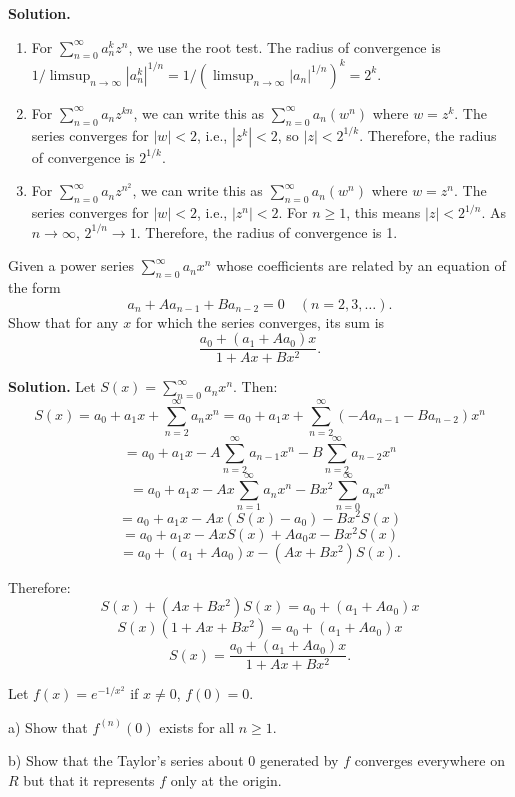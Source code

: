 \noindent\textbf{Solution.}
\begin{enumerate}[label=(\alph*)]
\item For \( \sum_{n=0}^{\infty} a_n^k z^n \), we use the root test. The radius of convergence is \( 1/\limsup_{n\to\infty} |a_n^k|^{1/n} = 1/(\limsup_{n\to\infty} |a_n|^{1/n})^k = 2^k \).

\item For \( \sum_{n=0}^{\infty} a_nz^{kn} \), we can write this as \( \sum_{n=0}^{\infty} a_n(w^n) \) where \( w = z^k \). The series converges for \( |w| < 2 \), i.e., \( |z^k| < 2 \), so \( |z| < 2^{1/k} \). Therefore, the radius of convergence is \( 2^{1/k} \).

\item For \( \sum_{n=0}^{\infty} a_nz^{n^2} \), we can write this as \( \sum_{n=0}^{\infty} a_n(w^n) \) where \( w = z^n \). The series converges for \( |w| < 2 \), i.e., \( |z^n| < 2 \). For \( n \geq 1 \), this means \( |z| < 2^{1/n} \). As \( n \to \infty \), \( 2^{1/n} \to 1 \). Therefore, the radius of convergence is 1.
\end{enumerate}

\begin{problembox}
Given a power series \( \sum_{n=0}^{\infty} a_nx^n \) whose coefficients are related by an equation of the form
\[ a_n + Aa_{n-1} + Ba_{n-2} = 0 \quad (n = 2, 3, \ldots). \]
Show that for any \( x \) for which the series converges, its sum is
\[ \frac{a_0 + (a_1 + Aa_0)x}{1 + Ax + Bx^2}. \]
\end{problembox}

\noindent\textbf{Solution.} Let \( S(x) = \sum_{n=0}^{\infty} a_nx^n \). Then:
\[S(x) = a_0 + a_1x + \sum_{n=2}^{\infty} a_nx^n = a_0 + a_1x + \sum_{n=2}^{\infty} (-Aa_{n-1} - Ba_{n-2})x^n\]
\[= a_0 + a_1x - A\sum_{n=2}^{\infty} a_{n-1}x^n - B\sum_{n=2}^{\infty} a_{n-2}x^n\]
\[= a_0 + a_1x - Ax\sum_{n=1}^{\infty} a_nx^n - Bx^2\sum_{n=0}^{\infty} a_nx^n\]
\[= a_0 + a_1x - Ax(S(x) - a_0) - Bx^2S(x)\]
\[= a_0 + a_1x - AxS(x) + Aa_0x - Bx^2S(x)\]
\[= a_0 + (a_1 + Aa_0)x - (Ax + Bx^2)S(x).\]

Therefore:
\[S(x) + (Ax + Bx^2)S(x) = a_0 + (a_1 + Aa_0)x\]
\[S(x)(1 + Ax + Bx^2) = a_0 + (a_1 + Aa_0)x\]
\[S(x) = \frac{a_0 + (a_1 + Aa_0)x}{1 + Ax + Bx^2}.\]

\begin{problembox}
Let \( f(x) = e^{-1/x^2} \) if \( x \neq 0 \), \( f(0) = 0 \).

a) Show that \( f^{(n)}(0) \) exists for all \( n \geq 1 \).

b) Show that the Taylor's series about 0 generated by \( f \) converges everywhere on \( R \) but that it represents \( f \) only at the origin.
\end{problembox}

